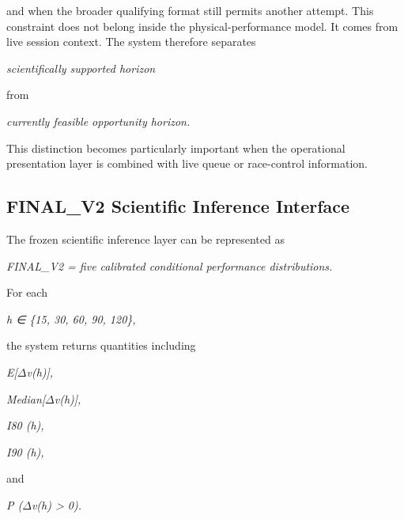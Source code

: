 and when the broader qualifying format still permits another attempt. This constraint does not belong inside the physical-performance model. It comes from live session context. The system therefore separates

\begin{center}\textit{scientifically supported horizon}\end{center}

from

\begin{center}\textit{currently feasible opportunity horizon.}\end{center}

This distinction becomes particularly important when the operational presentation layer is combined with live queue or race-control information.

\subsection{FINAL\_V2 Scientific Inference Interface}
The frozen scientific inference layer can be represented as

\begin{center}\textit{FINAL\_V2 = five calibrated conditional performance distributions.}\end{center}

For each

\begin{center}\textit{h ∈ \{15, 30, 60, 90, 120\},}\end{center}

the system returns quantities including

\begin{center}\textit{E[\ensuremath{\Delta}v(h)],}\end{center}

\begin{center}\textit{Median[\ensuremath{\Delta}v(h)],}\end{center}

\begin{center}\textit{I80 (h),}\end{center}

\begin{center}\textit{I90 (h),}\end{center}

and

\begin{center}\textit{P (\ensuremath{\Delta}v(h) > 0).}\end{center}

